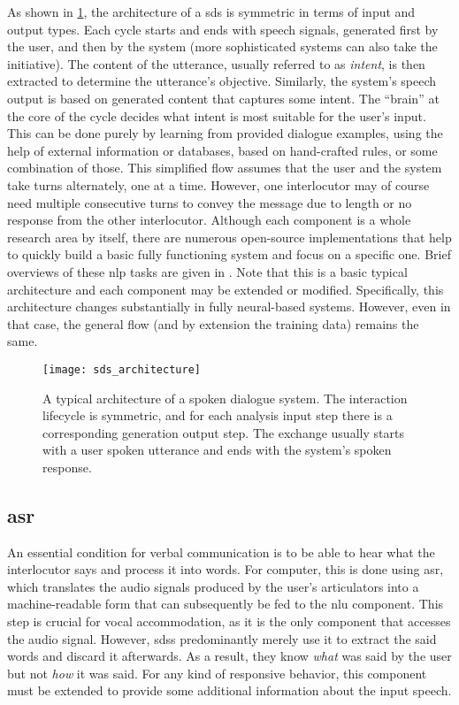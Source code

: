 As shown in \cref{fig:sds_architecture}, the architecture of a \ac{sds} is symmetric in terms of input and output types.
Each cycle starts and ends with speech signals, generated first by the user, and then by the system (more sophisticated systems can also take the initiative).
The content of the utterance, usually referred to as \emph{intent}, is then extracted to determine the utterance's objective.
Similarly, the system's speech output is based on generated content that captures some intent.
The \enquote{brain} at the core of the cycle decides what intent is most suitable for the user's input.
This can be done purely by learning from provided dialogue examples, using the help of external information or databases, based on hand-crafted rules, or some combination of those.
This simplified flow assumes that the user and the system take turns alternately, one at a time.
However, one interlocutor may of course need multiple consecutive turns to convey the message due to length or no response from the other interlocutor.
Although each component is a whole research area by itself, there are numerous open-source implementations that help to quickly build a basic fully functioning system and focus on a specific one.
Brief overviews of these \ac{nlp} tasks are given in .
Note that this is a basic typical architecture and each component may be extended or modified.
Specifically, this architecture changes substantially in fully neural-based systems.
However, even in that case, the general flow (and by extension the training data) remains the same.
%
\begin{figure}[t]
	\centering
	\texttt{[image: sds\_architecture]}
	\caption[Architecture of a spoken dialogue system]
	{A typical architecture of a spoken dialogue system.
	The interaction lifecycle is symmetric, and for each analysis input step there is a corresponding generation output step.
	The exchange usually starts with a user spoken utterance and ends with the system's spoken response.}
	\label{fig:sds_architecture}
\end{figure}

\subsection{\Acl{asr}}
\label{subsec:automatic_speech_recognition}

An essential condition for verbal communication is to be able to hear what the interlocutor says and process it into words.
For computer, this is done using \acf{asr}, which translates the audio signals produced by the user's articulators into a machine-readable form that can subsequently be fed to the \ac{nlu} component.
This step is crucial for vocal accommodation, as it is the only component that accesses the audio signal.
However, \acp{sds} predominantly merely use it to extract the said words and discard it afterwards.
As a result, they know \emph{what} was said by the user but not \emph{how} it was said.
For any kind of responsive behavior, this component must be extended to provide some additional information about the input speech.

